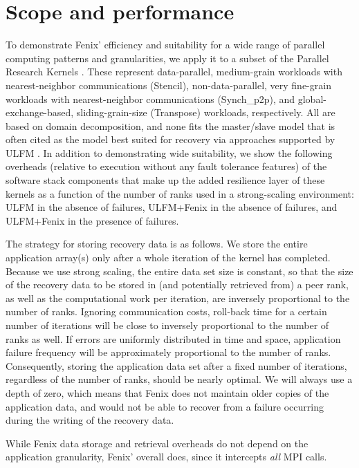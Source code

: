 \section{Scope and performance}\label{sec:experiments}
To demonstrate Fenix' efficiency and suitability for a wide range of parallel computing patterns and 
granularities, we apply it to a subset of the Parallel Research Kernels \cite{van2016comparing}.
These represent data-parallel, medium-grain workloads with nearest-neighbor communications (Stencil),
non-data-parallel, very fine-grain workloads with nearest-neighbor communications (Synch\_p2p), and 
global-exchange-based, sliding-grain-size (Transpose) workloads, respectively.
All are based on domain decomposition, and none fits the master/slave model that is often cited
as the model best suited for recovery via approaches supported by ULFM \cite{laguna2014evaluating,
laguna2016evaluating}.
In addition to demonstrating wide suitability, we show the following overheads (relative to
execution without any fault tolerance features) of the software
stack components that make up the added resilience layer of these kernels as a function of the
number of ranks used in a strong-scaling environment:
ULFM in the absence of failures, ULFM+Fenix in the absence of failures, and ULFM+Fenix in the
presence of failures.

The strategy for storing recovery data is as follows. 
We store the entire application array(s) only after a whole iteration of the kernel has
completed.
Because we use strong scaling, the entire data set size is constant, so that the size of 
the recovery data to be stored in (and potentially retrieved from) a peer rank, as
well as the computational work per iteration, are inversely proportional to the number of ranks. 
Ignoring communication costs, roll-back time for a certain number of iterations will be close to 
inversely proportional to the number of ranks as well.
If errors are uniformly distributed in time and space, application failure frequency will be
approximately proportional to the number of ranks. 
Consequently, storing the application data set after a fixed number of iterations, regardless
of the number of ranks, should be nearly optimal.
We will always use a depth of zero, which means that Fenix does not maintain older copies of
the application data, and would not be able to recover from a failure occurring during the 
writing of the recovery data.

While Fenix data storage and retrieval overheads do not depend on the application granularity,
Fenix' overall does, since it intercepts \textit{all} MPI calls.


